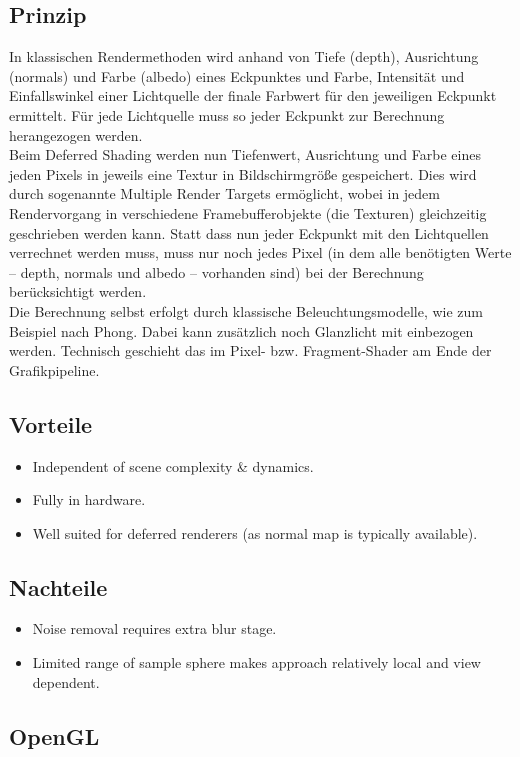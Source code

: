 \documentclass[10pt]{article}
\begin{document}
\subsection{Prinzip}
In klassischen Rendermethoden wird anhand von Tiefe (depth), Ausrichtung (normals) und Farbe (albedo) eines Eckpunktes und Farbe, Intensität und Einfallswinkel einer Lichtquelle der finale Farbwert für den jeweiligen Eckpunkt ermittelt. Für jede Lichtquelle muss so jeder Eckpunkt zur Berechnung herangezogen werden. \\
Beim Deferred Shading werden nun Tiefenwert, Ausrichtung und Farbe eines jeden Pixels in jeweils eine Textur in Bildschirmgröße gespeichert. Dies wird durch sogenannte Multiple Render Targets ermöglicht, wobei in jedem Rendervorgang in verschiedene Framebufferobjekte (die Texturen) gleichzeitig geschrieben werden kann. Statt dass nun jeder Eckpunkt mit den Lichtquellen verrechnet werden muss, muss nur noch jedes Pixel (in dem alle benötigten Werte – depth, normals und albedo – vorhanden sind) bei der Berechnung berücksichtigt werden. \\
Die Berechnung selbst erfolgt durch klassische Beleuchtungsmodelle, wie zum Beispiel nach Phong. Dabei kann zusätzlich noch Glanzlicht mit einbezogen werden. Technisch geschieht das im Pixel- bzw. Fragment-Shader am Ende der Grafikpipeline.
\subsection{Vorteile}
\begin{itemize}
	\item Independent of scene complexity \& dynamics.
	\item Fully in hardware.
	\item Well suited for deferred renderers (as normal map is typically available).
\end{itemize}
\subsection{Nachteile}
\begin{itemize}
	\item Noise removal requires extra blur stage.
	\item Limited range of sample sphere makes approach relatively local and view dependent.
\end{itemize}
\subsection{OpenGL}
\end{document}
